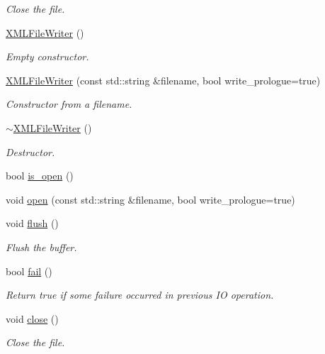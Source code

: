 \begin{DoxyCompactItemize}
\begin{DoxyCompactList}\small\item\em Close the file. \end{DoxyCompactList}\item 
\mbox{\hyperlink{classADATXML_1_1XMLFileWriter_a40db177b66a4598583a3a08e19c1e927}{X\+M\+L\+File\+Writer}} ()
\begin{DoxyCompactList}\small\item\em Empty constructor. \end{DoxyCompactList}\item 
\mbox{\hyperlink{classADATXML_1_1XMLFileWriter_a83cf749ff969a30d3de1895f271b238a}{X\+M\+L\+File\+Writer}} (const std\+::string \&filename, bool write\+\_\+prologue=true)
\begin{DoxyCompactList}\small\item\em Constructor from a filename. \end{DoxyCompactList}\item 
\mbox{\hyperlink{classADATXML_1_1XMLFileWriter_af3d1109d92631884682eac46624ca7fd}{$\sim$\+X\+M\+L\+File\+Writer}} ()
\begin{DoxyCompactList}\small\item\em Destructor. \end{DoxyCompactList}\item 
bool \mbox{\hyperlink{classADATXML_1_1XMLFileWriter_a60fa87bbd9300c37386f9fdcb9460f74}{is\+\_\+open}} ()
\item 
void \mbox{\hyperlink{classADATXML_1_1XMLFileWriter_a76f52e7ccdfe3b82875f30953cfd2447}{open}} (const std\+::string \&filename, bool write\+\_\+prologue=true)
\item 
void \mbox{\hyperlink{classADATXML_1_1XMLFileWriter_a63097bd3fafbcf99804b4106700b524d}{flush}} ()
\begin{DoxyCompactList}\small\item\em Flush the buffer. \end{DoxyCompactList}\item 
bool \mbox{\hyperlink{classADATXML_1_1XMLFileWriter_a0294354e26b7ad1be1ca75f470db4788}{fail}} ()
\begin{DoxyCompactList}\small\item\em Return true if some failure occurred in previous IO operation. \end{DoxyCompactList}\item 
void \mbox{\hyperlink{classADATXML_1_1XMLFileWriter_a1a51ceb51781ac6f3a476dcf99a75017}{close}} ()
\begin{DoxyCompactList}\small\item\em Close the file. \end{DoxyCompactList}\item 

\end{DoxyCompactItemize}
